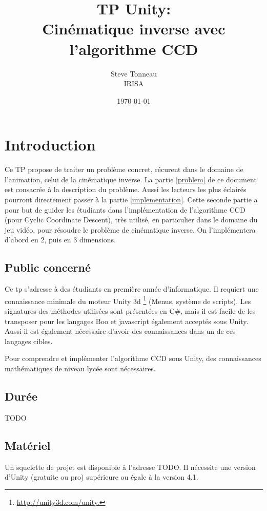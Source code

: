 \documentclass{article}
\title{TP Unity: \\ Cin\'ematique inverse avec l'algorithme CCD }
\date{\today}
\author{Steve Tonneau\\ IRISA}
\begin{document}
\maketitle

\section*{Introduction}
Ce TP propose de traiter un probl\`eme concret, r\'ecurent dans le domaine de l'animation, celui de la 
cin\'ematique inverse. La partie \ref{problem} de ce document est consacr\'ee \`a la description du probl\`eme. Aussi
les lecteurs les plus \'eclair\'es pourront directement passer \`a la partie \ref{implementation}. Cette seconde partie a pour 
but de guider les \'etudiants dans l'impl\'ementation de l'algorithme CCD (pour Cyclic Coordinate Descent), tr\`es utilis\'e,
en particulier dans le domaine du jeu vid\'eo, pour r\'esoudre le probl\`eme de cin\'ematique inverse.
On l'impl\'ementera d'abord en 2, puis en 3 dimensions.

\subsection*{Public concern\'e}
Ce tp s'adresse \`a des \'etudiants en premi\`ere ann\'ee d'informatique. Il requiert une connaissance
minimale du moteur Unity 3d \footnote{\href{http://unity3d.com/unity}{http://unity3d.com/unity.}} (Menus, syst\`eme de scripts).
Les signatures des m\'ethodes utilis\'ees sont pr\'esent\'ees en C\#, mais il est facile de les transposer pour les langages Boo et javascript
\'egalement accept\'es sous Unity. Aussi il est \'egalement n\'ecessaire d'avoir des connaissances dans un de ces langages cibles.

Pour comprendre et impl\'ementer l'algorithme CCD sous Unity, des connaissances math\'ematiques de niveau lyc\'ee sont n\'ecessaires.

\subsection*{Dur\'ee}
TODO 

\subsection*{Mat\'eriel}
Un squelette de projet est disponible \`a l'adresse TODO. Il n\'ecessite une version d'Unity (gratuite ou pro) sup\'erieure ou \'egale \`a la version 4.1. \\
\end{document}

